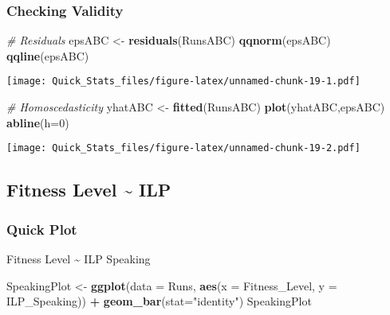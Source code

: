 \documentclass[]{article}
\newenvironment{Shaded}{\begin{snugshade}}{\end{snugshade}}
\newcommand{\KeywordTok}[1]{\textcolor[rgb]{0.13,0.29,0.53}{\textbf{#1}}}
\newcommand{\DataTypeTok}[1]{\textcolor[rgb]{0.13,0.29,0.53}{#1}}
\newcommand{\DecValTok}[1]{\textcolor[rgb]{0.00,0.00,0.81}{#1}}
\newcommand{\StringTok}[1]{\textcolor[rgb]{0.31,0.60,0.02}{#1}}
\newcommand{\CommentTok}[1]{\textcolor[rgb]{0.56,0.35,0.01}{\textit{#1}}}
\newcommand{\OperatorTok}[1]{\textcolor[rgb]{0.81,0.36,0.00}{\textbf{#1}}}
\newcommand{\NormalTok}[1]{#1}
\begin{document}
\subsubsection{Checking Validity}\label{checking-validity-3}

\begin{Shaded}
\begin{Highlighting}[]
\CommentTok{# Residuals }
\NormalTok{epsABC <-}\StringTok{ }\KeywordTok{residuals}\NormalTok{(RunsABC) }
\KeywordTok{qqnorm}\NormalTok{(epsABC) }
\KeywordTok{qqline}\NormalTok{(epsABC) }
\end{Highlighting}
\end{Shaded}

\texttt{[image: Quick\_Stats\_files/figure-latex/unnamed-chunk-19-1.pdf]}

\begin{Shaded}
\begin{Highlighting}[]
\CommentTok{# Homoscedasticity }
\NormalTok{yhatABC <-}\StringTok{ }\KeywordTok{fitted}\NormalTok{(RunsABC) }
\KeywordTok{plot}\NormalTok{(yhatABC,epsABC) }
\KeywordTok{abline}\NormalTok{(}\DataTypeTok{h=}\DecValTok{0}\NormalTok{) }
\end{Highlighting}
\end{Shaded}

\texttt{[image: Quick\_Stats\_files/figure-latex/unnamed-chunk-19-2.pdf]}

\subsection{Fitness Level \textasciitilde{}
ILP}\label{fitness-level-ilp}

\subsubsection{Quick Plot}\label{quick-plot-4}

Fitness Level \textasciitilde{} ILP Speaking

\begin{Shaded}
\begin{Highlighting}[]
\NormalTok{SpeakingPlot <-}\StringTok{ }\KeywordTok{ggplot}\NormalTok{(}\DataTypeTok{data =}\NormalTok{ Runs, }\KeywordTok{aes}\NormalTok{(}\DataTypeTok{x =}\NormalTok{ Fitness_Level, }\DataTypeTok{y =}\NormalTok{ ILP_Speaking)) }\OperatorTok{+}
\StringTok{  }\KeywordTok{geom_bar}\NormalTok{(}\DataTypeTok{stat=}\StringTok{"identity"}\NormalTok{)}
\NormalTok{SpeakingPlot}
\end{Highlighting}
\end{Shaded}
\end{document}
